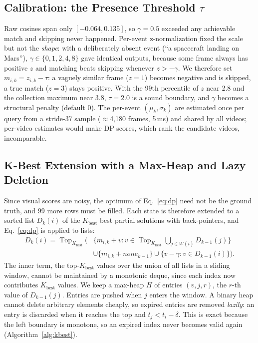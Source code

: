 \documentclass[runningheads]{llncs}
\newcommand{\Kb}{K_{\mathrm{best}}}
\begin{document}
\subsection{Calibration: the Presence Threshold $\tau$}
\label{sec:calib}
Raw cosines span only $[-0.064,0.135]$, so $\gamma=0.5$ exceeded any achievable match and skipping never happened. Per-event z-normalization fixed the scale but not the \emph{shape}: with a deliberately absent event (``a spacecraft landing on Mars''), $\gamma\in\{0,1,2,4,8\}$ gave identical outputs, because some frame always has positive $z$ and matching beats skipping whenever $z>-\gamma$. We therefore set $m_{i,k}=z_{i,k}-\tau$: a vaguely similar frame ($z=1$) becomes negative and is skipped, a true match ($z=3$) stays positive. With the 99th percentile of $z$ near 2.8 and the collection maximum near 3.8, $\tau=2.0$ is a sound boundary, and $\gamma$ becomes a structural penalty (default 0). The per-event $(\mu_k,\sigma_k)$ are estimated once per query from a stride-37 sample ($\approx$4,180 frames, 5\,ms) and shared by all videos; per-video estimates would make DP scores, which rank the candidate videos, incomparable.

\subsection{K-Best Extension with a Max-Heap and Lazy Deletion}
Since visual scores are noisy, the optimum of Eq.~\eqref{eq:dp} need not be the ground truth, and 99 more rows must be filled. Each state is therefore extended to a sorted list $D_k(i)$ of the $\Kb$ best partial solutions with back-pointers, and Eq.~\eqref{eq:dp} is applied to lists:
\begin{equation}
\begin{aligned}
D_k(i)=\operatorname{Top}_{\Kb}\Big(&\{m_{i,k}+v: v\in\operatorname{Top}_{\Kb}\textstyle\bigcup_{j\in W(i)}D_{k-1}(j)\}\\
&\cup\{m_{i,k}+\mathit{none}_{k-1}\}\cup\{v-\gamma: v\in D_{k-1}(i)\}\Big).
\end{aligned}
\label{eq:kbest}
\end{equation}
The inner term, the top-$\Kb$ values over the union of all lists in a sliding window, cannot be maintained by a monotonic deque, since each index now contributes $\Kb$ values. We keep a max-heap $H$ of entries $(v,j,r)$, the $r$-th value of $D_{k-1}(j)$. Entries are pushed when $j$ enters the window. A binary heap cannot delete arbitrary elements cheaply, so expired entries are removed \emph{lazily}: an entry is discarded when it reaches the top and $t_j<t_i-\delta$. This is exact because the left boundary is monotone, so an expired index never becomes valid again (Algorithm~\ref{alg:kbest}).
\end{document}

